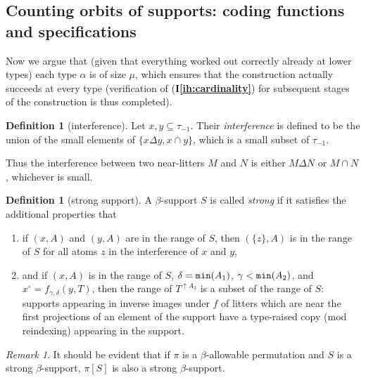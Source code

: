 \documentclass{article}
\theoremstyle{definition}
\newtheorem{definition}[theorem]{Definition}
\theoremstyle{remark}
\newtheorem{remark}[theorem]{Remark}
\newcommand{\ihref}[1]{(\textbf{I\ref{#1}})}
\begin{document}
\newpage
\subsection{Counting orbits of supports:  coding functions and specifications}

Now we argue that (given that everything worked out correctly already at lower types) each type $\alpha$ is of size $\mu$, which ensures
that the construction actually succeeds at every type (verification of \ihref{ih:cardinality} for subsequent stages of the construction is thus completed).





\begin{definition}[interference]
Let $x, y \subseteq \tau_{-1}$.
Their {\em interference\/} is defined to be the union of the small elements of $\{ x \Delta y, x \cap y \}$, which is a small subset of $\tau_{-1}$.
\end{definition}
Thus the interference between two near-litters $M$ and $N$ is either $M \Delta N$ or $M \cap N$, whichever is small.
\begin{definition}[strong support]\label{def:strong_support}
A $\beta$-support $S$ is called {\em strong\/}
if it satisfies the additional properties that

\begin{enumerate}

\item if $(x,A)$ and $(y,A)$ are in the range of $S$, then $(\{z\},A)$ is in the range of $S$ for all atoms $z$ in the interference of $x$ and $y$,

\item and if $(x,A)$ is in the range of $S$, $\delta={\tt min}(A_1)$, $\gamma<{\tt min}(A_2)$, and $x^\circ = f_{\gamma,\delta}(y,T)$, then the range of $T^{\uparrow A_2}$ is a subset of the range of $S$:  supports appearing in inverse images under $f$ of litters which are near the first projections of an element of the support have a type-raised copy (mod reindexing) appearing in the support.
\end{enumerate}
\end{definition}


\begin{remark}
It should be evident that if $\pi$ is a $\beta$-allowable permutation and $S$ is a strong $\beta$-support,
$\pi[S]$ is also a strong $\beta$-support.
\end{remark}
\end{document}
